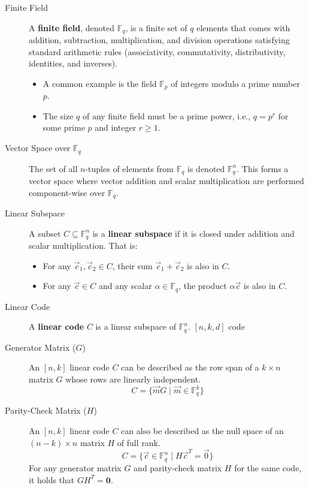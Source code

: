 \begin{description}
    \item[Finite Field] A \textbf{finite field}, denoted $\mathbb{F}_q$, is a 
        finite set of $q$ elements that comes with addition, subtraction, multiplication, 
        and division operations satisfying standard arithmetic rules (associativity, commutativity, distributivity, identities, and inverses).
    \begin{itemize}
        \item A common example is the field $\mathbb{F}_p$ of integers modulo a prime number $p$.
        \item The size $q$ of any finite field must be a prime power, i.e., $q = p^r$ for some prime $p$ and integer $r \ge 1$.
    \end{itemize}

    \item[Vector Space over $\mathbb{F}_q$] The set of all $n$-tuples of elements from $\mathbb{F}_q$ is denoted $\mathbb{F}_q^n$. This forms a vector space where vector addition and scalar multiplication are performed component-wise over $\mathbb{F}_q$.

    \item[Linear Subspace] A subset $C \subseteq \mathbb{F}_q^n$ is a \textbf{linear subspace} if it is closed under addition and scalar multiplication. That is:
    \begin{itemize}
        \item For any $\vec{c}_1, \vec{c}_2 \in C$, their sum $\vec{c}_1 + \vec{c}_2$ is also in $C$.
        \item For any $\vec{c} \in C$ and any scalar $\alpha \in \mathbb{F}_q$, the product $\alpha\vec{c}$ is also in $C$.
    \end{itemize}
\end{description}
\begin{description}
    \item[Linear Code] A \textbf{linear code} $C$ is a linear subspace of $\mathbb{F}_q^n$. $[n, k, d]$ code 

    \item[Generator Matrix ($G$)] An $[n, k]$ linear code $C$ can be described as the row span of a $k \times n$ matrix $G$ whose rows are linearly independent.
    \[
        C = \{ \vec{m}G \mid \vec{m} \in \mathbb{F}_q^k \}
    \]
    \item[Parity-Check Matrix ($H$)] An $[n, k]$ linear code $C$ can also be described as the null space of an $(n-k) \times n$ matrix $H$ of full rank.
    \[
        C = \{ \vec{c} \in \mathbb{F}_q^n \mid H\vec{c}^T = \vec{0} \}
    \]
    For any generator matrix $G$ and parity-check matrix $H$ for the same code, it holds that $GH^T = \mathbf{0}$.
\end{description}

